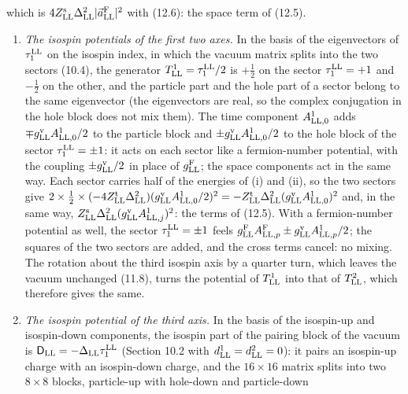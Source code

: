 \documentclass[
  10pt,
]{article}
\begin{document}
which is
\(4Z^{\rm s}_{\rm LL}\Delta_{\rm LL}^2\lvert\vec a^{\rm F}_{\rm LL}\rvert^2\)
with (12.6): the space term of (12.5).

\begin{enumerate}
\def\labelenumi{(\roman{enumi})}
\setcounter{enumi}{2}
\item
  \emph{The isospin potentials of the first two axes.} In the basis of
  the eigenvectors of \(\tau^{\rm LL}_1\) on the isospin index, in which
  the vacuum matrix splits into the two sectors (10.4), the generator
  \(T^1_{\rm LL}=\tau^{\rm LL}_1/2\) is \(+\tfrac12\) on the sector
  \(\tau^{\rm LL}_1=+1\) and \(-\tfrac12\) on the other, and the
  particle part and the hole part of a sector belong to the same
  eigenvector (the eigenvectors are real, so the complex conjugation in
  the hole block does not mix them). The time component
  \(A^1_{{\rm LL},0}\) adds \(\mp g^{\rm v}_{\rm LL}A^1_{{\rm LL},0}/2\)
  to the particle block and \(\pm g^{\rm v}_{\rm LL}A^1_{{\rm LL},0}/2\)
  to the hole block of the sector \(\tau^{\rm LL}_1=\pm1\): it acts on
  each sector like a fermion-number potential, with the coupling
  \(\pm g^{\rm v}_{\rm LL}/2\) in place of \(g^{\rm F}_{\rm LL}\); the
  space components act in the same way. Each sector carries half of the
  energies of (i) and (ii), so the two sectors give
  \(2\times\tfrac12\times(-4Z^{\rm t}_{\rm LL}\Delta_{\rm LL}^2)(g^{\rm v}_{\rm LL}A^1_{{\rm LL},0}/2)^2=-Z^{\rm t}_{\rm LL}\Delta_{\rm LL}^2(g^{\rm v}_{\rm LL}A^1_{{\rm LL},0})^2\)
  and, in the same way,
  \(Z^{\rm s}_{\rm LL}\Delta_{\rm LL}^2(g^{\rm v}_{\rm LL}A^1_{{\rm LL},j})^2\):
  the terms of (12.5). With a fermion-number potential as well, the
  sector \(\tau^{\rm LL}_1=\pm1\) feels
  \(g^{\rm F}_{\rm LL}A^{\rm F}_{{\rm LL},p}\pm g^{\rm v}_{\rm LL}A^1_{{\rm LL},p}/2\);
  the squares of the two sectors are added, and the cross terms cancel:
  no mixing. The rotation about the third isospin axis by a quarter
  turn, which leaves the vacuum unchanged (11.8), turns the potential of
  \(T^1_{\rm LL}\) into that of \(T^2_{\rm LL}\), which therefore gives
  the same.
\item
  \emph{The isospin potential of the third axis.} In the basis of the
  isospin-up and isospin-down components, the isospin part of the
  pairing block of the vacuum is
  \(\mathsf D_{\rm LL}=-\Delta_{\rm LL}\tau^{\rm LL}_1\) (Section 10.2
  with \(d^1_{\rm LL}=d^2_{\rm LL}=0\)): it pairs an isospin-up charge
  with an isospin-down charge, and the \(16\times16\) matrix splits into
  two \(8\times8\) blocks, particle-up with hole-down and particle-down

\end{enumerate}
\end{document}
